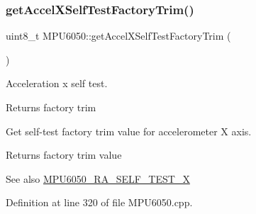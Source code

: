 \begin{DoxyCode}{0}

\end{DoxyCode}
\mbox{\label{classMPU6050_a0cfaa7fbf63fb5867e003d490eb3fd96}} 
\subsubsection{\texorpdfstring{getAccelXSelfTestFactoryTrim()}{getAccelXSelfTestFactoryTrim()}}
{\footnotesize\ttfamily uint8\+\_\+t M\+P\+U6050\+::get\+Accel\+X\+Self\+Test\+Factory\+Trim (\begin{DoxyParamCaption}{ }\end{DoxyParamCaption})}

Acceleration x self test.

\begin{DoxyReturn}{Returns}
factory trim
\end{DoxyReturn}
Get self-\/test factory trim value for accelerometer X axis. \begin{DoxyReturn}{Returns}
factory trim value 
\end{DoxyReturn}
\begin{DoxySeeAlso}{See also}
\mbox{\hyperlink{MPU6050_8h_a7ec394e32416951b6882ebe6ae924965}{M\+P\+U6050\+\_\+\+R\+A\+\_\+\+S\+E\+L\+F\+\_\+\+T\+E\+S\+T\+\_\+X}} 
\end{DoxySeeAlso}


Definition at line 320 of file M\+P\+U6050.\+cpp.



